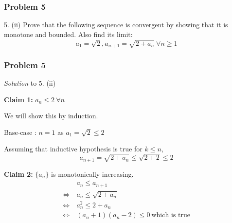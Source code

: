 \documentclass[
	11pt, %
]{beamer}
\begin{document}

\begin{frame}
	\frametitle{Problem 5}
	
	\begin{block}{5. (ii)}
		Prove that the following sequence is convergent by showing that it is monotone and bounded. Also find its limit:
		\[ a_1 = \sqrt2, a_{n+1} = \sqrt{2 + a_n} ~ \forall n \geq 1\]
	\end{block}
	
\end{frame}

\begin{frame}[t]
	\frametitle{Problem 5}

	\textit{Solution} to 5. (ii) -

	\bigskip

	\textbf{Claim 1:} $a_n \leq 2 ~ \forall n$
	
	\medskip
	
	We will show this by induction.

	\smallskip

	Base-case : $n = 1$ as $a_1 = \sqrt 2 \leq 2$

	Assuming that inductive hypothesis is true for $k \leq n$,
	\[a_{n+1} = \sqrt{2 + a_n} \leq \sqrt{2 + 2} \leq 2\]

	\medskip

	\textbf{Claim 2:} $\{a_n\}$ is monotonically increasing.
	\begin{align*}
		& a_n \leq a_{n+1} \\
		\Leftrightarrow ~ & a_n \leq \sqrt{2 + a_n} \\
		\Leftrightarrow ~ & a_n^2 \leq 2 + a_n \\
		\Leftrightarrow ~ & (a_n + 1)(a_n - 2) \leq 0 ~ \text{which is true}\\
	\end{align*}
	
\end{frame}
\end{document}
